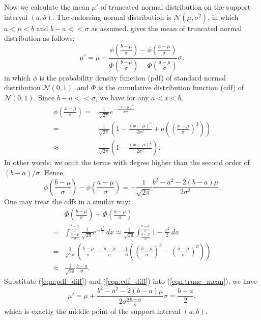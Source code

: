 \documentclass{IEEEtran}
\begin{document}
Now we calculate the mean $\mu'$ of truncated normal distribution on the support interval $(a, b)$. The endorsing normal distribution is $\mathcal{N}(\mu, \sigma^2)$, in which $a < \mu < b$ and $b-a<<\sigma$ as assumed. \cite{burkardt2014truncated} gives the mean of truncated normal distribution as follows:
\begin{equation}
\label{eqn:trunc_mean}
\mu' = \mu - \frac{\phi(\frac{b-\mu}{\sigma}) - \phi(\frac{a-\mu}{\sigma})}{\Phi(\frac{b-\mu}{\sigma}) - \Phi(\frac{a-\mu}{\sigma})}\sigma,
\end{equation}
in which $\phi$ is the probability density function (pdf) of standard normal distribution $\mathcal{N}(0,1)$, and $\Phi$ is the cumulative distribution function (cdf) of $\mathcal{N}(0,1)$. Since $b-a << \sigma$, we have for any $a<x<b$,
\begin{equation}
\begin{aligned}
\phi(\frac{x-\mu}{\sigma}) = &\frac{1}{\sqrt{2\pi}}e^{-\frac{(x-\mu)^2}{2\sigma^2}}\\
= &\frac{1}{\sqrt{2\pi}}(1-\frac{(x-\mu)^2}{2\sigma^2}+o((\frac{x-\mu}{\sigma})^3)) \\
\approx &\frac{1}{\sqrt{2\pi}}(1-\frac{(x-\mu)^2}{2\sigma^2}).
\end{aligned}
\end{equation}
In other words, we omit the terms with degree higher than the second order of $(b-a)/\sigma$. Hence
\begin{equation}
\label{eqn:pdf_diff}
\phi(\frac{b-\mu}{\sigma}) - \phi(\frac{a-\mu}{\sigma}) = -\frac{1}{\sqrt{2\pi}}\frac{b^2-a^2 - 2(b-a)\mu}{2\sigma^2}.
\end{equation}
One may treat the cdfs in a similar way:
\begin{equation}
\label{eqn:cdf_diff}
\begin{aligned}
&\Phi(\frac{b-\mu}{\sigma}) - \Phi(\frac{a-\mu}{\sigma}) \\
= &\int_{\frac{a-\mu}{\sigma}}^{\frac{b-\mu}{\sigma}} \frac{1}{\sqrt{2\pi}}e^{-\frac{x^2}{2}} \,dx \approx \frac{1}{\sqrt{2\pi}}\int_{\frac{a-\mu}{\sigma}}^{\frac{b-\mu}{\sigma}} 1 - \frac{x^2}{2} \,dx \\
= &\frac{1}{\sqrt{2\pi}}\left(\frac{b-\mu}{\sigma} - \frac{a-\mu}{\sigma} -\frac{1}{6}\left( (\frac{b-\mu}{\sigma})^3 - (\frac{a-\mu}{\sigma})^3 \right) \right) \\
\approx & \frac{1}{\sqrt{2\pi}}\frac{b-a}{\sigma}.
\end{aligned}
\end{equation}
Substitute (\ref{eqn:pdf_diff}) and (\ref{eqn:cdf_diff}) into (\ref{eqn:trunc_mean}), we have
\begin{equation}
\mu' = \mu + \frac{b^2-a^2 - 2(b-a)\mu}{2\sigma^2\frac{b-a}{\sigma}}\sigma = \frac{b+a}{2},
\end{equation}
which is exactly the middle point of the support interval $(a,b)$.
\end{document}
